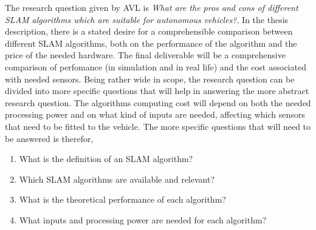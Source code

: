 The research question given by AVL is \textit{What are the pros and
cons of different SLAM algorithms which are suitable for autonomous vehicles?}.
In the thesis description, there is a stated desire for a comprehensible
comparison between different SLAM
algorithms, both on the performance of the algorithm and the price of the
needed hardware. The final deliverable will be a comprehensive comparison of
perfomance (in simulation and in real life) and the cost associated with needed
sensors. Being rather wide in scope, the research question can be divided into
more specific questions that will help in answering the more abstract research
question. The algorithms computing cost will depend on both the needed
processing power and
on what kind of inputs are needed, affecting which sensors that need to be
fitted to the vehicle. The more specific questions that will need to be answered is therefor, 
\begin{enumerate}
    \item What is the definition of an SLAM algorithm?
    \item Which SLAM algorithms are available and relevant?
    \item What is the theoretical performance of each algorithm?
    \item What inputs and processing power are needed for each algorithm?
\end{enumerate}
